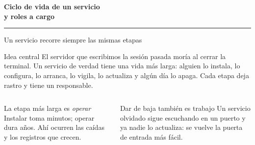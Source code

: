 \documentclass[aspectratio=169,10pt,c]{beamer}
\begin{document}
\begin{frame}[plain]
\vfill
\begin{center}
{\fontsize{29}{34}\selectfont\bfseries Ciclo de vida de un servicio\\ y roles a cargo}\par
\vspace{4mm}
{\color{utpRojo}\rule{8.5cm}{1.2pt}}
\end{center}
\vfill
\end{frame}

\begin{frame}{Un servicio recorre siempre las mismas etapas}
\begin{block}{Idea central}
\small El servidor que escribimos la sesión pasada moría al cerrar la terminal. Un servicio de verdad tiene una vida más larga: alguien lo instala, lo configura, lo arranca, lo vigila, lo actualiza y algún día lo apaga. Cada etapa deja rastro y tiene un responsable.
\end{block}
\begin{center}
\end{center}
\begin{columns}[T,onlytextwidth]
\begin{exampleblock}{La etapa más larga es \emph{operar}}
\small Instalar toma minutos; operar dura años. Ahí ocurren las caídas y los registros que crecen.
\end{exampleblock}
\begin{exampleblock}{Dar de baja también es trabajo}
\small Un servicio olvidado sigue escuchando en un puerto y ya nadie lo actualiza: se vuelve la puerta de entrada más fácil.
\end{exampleblock}
\end{columns}
\end{frame}
\end{document}
